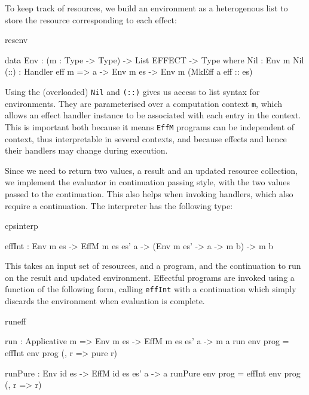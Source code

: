 \noindent
To keep track of resources, we build an environment as a heterogenous list to
store the resource corresponding to each effect:

\begin{SaveVerbatim}{resenv}

data Env  : (m : Type -> Type) -> 
            List EFFECT -> Type where
     Nil  : Env m Nil
     (::) : Handler eff m => 
            a -> Env m es -> Env m (MkEff a eff :: es)

\end{SaveVerbatim}
\label{sect:envdef}

\noindent
Using the (overloaded) \texttt{Nil} and \texttt{(::)} gives us access to list
syntax for environments. They are parameterised over a computation context
\texttt{m}, which allows an effect handler instance to be associated with each
entry in the context. This is important both because it means \texttt{EffM}
programs can be independent of context, thus interpretable in several
contexts, and because effects and hence their handlers may change during 
execution.

Since we need to return two values, a result and an updated resource collection,
we implement the evaluator in continuation passing style, with the two values
passed to the continuation. This also helps when invoking handlers, which also
require a continuation. The interpreter has the following type:

\begin{SaveVerbatim}{cpsinterp}

effInt : Env m es -> EffM m es es' a -> 
         (Env m es' -> a -> m b) -> m b

\end{SaveVerbatim}

\noindent
This takes an input set of resources, and a program, and the continuation to run
on the result and updated environment. Effectful programs are invoked using
a function of the following form, calling \texttt{effInt}
with a continuation which simply discards the environment when evaluation is
complete.

\begin{SaveVerbatim}{runeff}

run : Applicative m => 
      Env m es -> EffM m es es' a -> m a
run env prog = effInt env prog (\env, r => pure r)

runPure : Env id es -> EffM id es es' a -> a
runPure env prog = effInt env prog (\env, r => r)

\end{SaveVerbatim}

